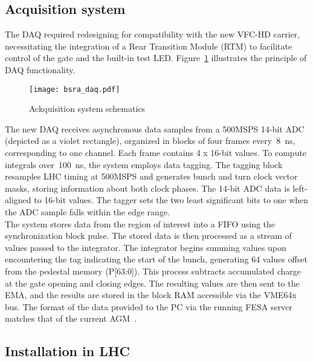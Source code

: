 \subsection{Acquisition system}
The DAQ required redesigning for compatibility with the new VFC-HD carrier,
necessitating the integration of a Rear Transition Module (RTM) to facilitate
control of the gate and the built-in test LED. Figure~\ref{fig:bsra_daq}
illustrates the principle of DAQ functionality.
\begin{figure}[!tbh]
    \centering
    \texttt{[image: bsra\_daq.pdf]}
    \caption{Ackquisition system schematics}
    \label{fig:bsra_daq}
\end{figure}
The new DAQ receives asynchronous data samples from a 500MSPS 14-bit ADC
(depicted as a violet rectangle), organized in blocks of four frames
every~\SI{8}{\nano s}, corresponding to one channel. Each frame contains 4 x
16-bit values. To compute integrals over~\SI{100}{\nano\second}, the system
employs data tagging. The tagging block resamples LHC timing at 500MSPS and
generates bunch and turn clock vector masks, storing information about both
clock phases. The 14-bit ADC data is left-aligned to 16-bit values. The tagger
sets the two least significant bits to one when the ADC sample falls within the
edge range.\\
The system stores data from the region of interest into a FIFO using the
synchronization block pulse. The stored data is then processed as a stream of
values passed to the integrator. The integrator begins summing values upon
encountering the tag indicating the start of the bunch, generating 64 values
offset from the pedestal memory (P[63:0]). This process subtracts accumulated
charge at the gate opening and closing edges. The resulting values are then
sent to the EMA, and the results are stored in the
block RAM accessible via the VME64x bus. The format of the data provided to the
PC via the running FESA server matches that of the current
AGM~\cite{my_thesis}.

\subsection{Installation in LHC}

